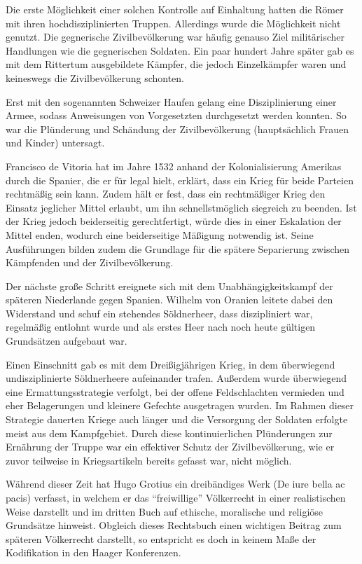 \documentclass[12pt]{scrartcl}
\begin{document}
Die erste Möglichkeit einer solchen Kontrolle auf Einhaltung hatten die Römer mit ihren hochdisziplinierten Truppen. Allerdings wurde die Möglichkeit nicht genutzt. Die gegnerische Zivilbevölkerung war häufig genauso Ziel militärischer Handlungen wie die gegnerischen Soldaten. Ein paar hundert Jahre später gab es mit dem Rittertum ausgebildete Kämpfer, die jedoch Einzelkämpfer waren und keineswegs die Zivilbevölkerung schonten.

Erst mit den sogenannten Schweizer Haufen gelang eine Disziplinierung einer Armee, sodass Anweisungen von Vorgesetzten durchgesetzt werden konnten. So war die Plünderung und Schändung der Zivilbevölkerung (hauptsächlich Frauen und Kinder) untersagt.

Francisco de Vitoria hat im Jahre 1532 anhand der Kolonialisierung Amerikas durch die Spanier, die er für legal hielt, erklärt, dass ein Krieg für beide Parteien rechtmäßig sein kann. Zudem hält er fest, dass ein rechtmäßiger Krieg den Einsatz jeglicher Mittel erlaubt, um ihn schnellstmöglich siegreich zu beenden. Ist der Krieg jedoch beiderseitig gerechtfertigt, würde dies in einer Eskalation der Mittel enden, wodurch eine beiderseitige Mäßigung notwendig ist. Seine Ausführungen bilden zudem die Grundlage für die spätere Separierung zwischen Kämpfenden und der Zivilbevölkerung.

Der nächste große Schritt ereignete sich mit dem Unabhängigkeitskampf der späteren Niederlande gegen Spanien. Wilhelm von Oranien leitete dabei den Widerstand und schuf ein stehendes Söldnerheer, dass diszipliniert war, regelmäßig entlohnt wurde und als erstes Heer nach noch heute gültigen Grundsätzen aufgebaut war. 

Einen Einschnitt gab es mit dem Dreißigjährigen Krieg, in dem überwiegend undisziplinierte Söldnerheere aufeinander trafen. Außerdem wurde überwiegend eine Ermattungsstrategie verfolgt, bei der offene Feldschlachten vermieden und eher Belagerungen und kleinere Gefechte ausgetragen wurden. Im Rahmen dieser Strategie dauerten Kriege auch länger und die Versorgung der Soldaten erfolgte meist aus dem Kampfgebiet. Durch diese kontinuierlichen Plünderungen zur Ernährung der Truppe war ein effektiver Schutz der Zivilbevölkerung, wie er zuvor teilweise in Kriegsartikeln bereits gefasst war, nicht möglich.

Während dieser Zeit hat Hugo Grotius ein dreibändiges Werk (De iure bella ac pacis) verfasst, in welchem er das "`freiwillige"' Völkerrecht in einer realistischen Weise darstellt und im dritten Buch auf ethische, moralische und religiöse Grundsätze hinweist. Obgleich dieses Rechtsbuch einen wichtigen Beitrag zum späteren Völkerrecht darstellt, so entspricht es doch in keinem Maße der Kodifikation in den Haager Konferenzen.
\end{document}
